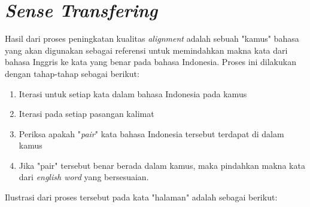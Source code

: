 \section{\textit{Sense Transfering}}
Hasil dari proses peningkatan kualitas \textit{alignment} adalah sebuah "kamus" bahasa yang akan digunakan sebagai referensi untuk memindahkan makna kata dari bahasa Inggris ke kata yang benar pada bahasa Indonesia. Proses ini dilakukan dengan tahap-tahap sebagai berikut:

\begin{enumerate}
	\item Iterasi untuk setiap kata dalam bahasa Indonesia pada kamus
	\item Iterasi pada setiap pasangan kalimat
	\item Periksa apakah "\textit{pair}" kata bahasa Indonesia tersebut terdapat di dalam kamus
	\item Jika "pair" tersebut benar berada dalam kamus, maka pindahkan makna kata dari \textit{english word} yang bersesuaian.
\end{enumerate}

Ilustrasi dari proses tersebut pada kata "halaman" adalah sebagai berikut:

